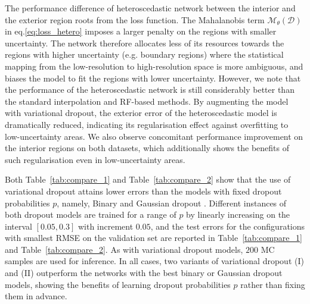 The performance difference of heteroscedastic network between the interior and the exterior region roots from the loss function. The Mahalanobis term $\mathcal{M}_{\theta}(\mathcal{D})$ in eq.\eqref{eq:loss_hetero} imposes a larger penalty on the regions with smaller  uncertainty. The network therefore allocates less of its resources towards the regions with higher uncertainty (e.g. boundary regions) where the statistical mapping from the low-resolution to high-resolution space is more ambiguous, and biases the model to fit the regions with lower uncertainty. However, we note that the performance of the heteroscedastic network is still considerably better than the standard interpolation and RF-based methods. By augmenting the model with variational dropout, the exterior error of the heteroscedastic model is dramatically reduced, indicating its regularisation effect against overfitting to low-uncertainty areas. We also observe concomitant performance improvement on the interior regions on both datasets, which additionally shows the benefits of such regularisation even in low-uncertainty areas. 

Both Table~\ref{tab:compare_1} and Table~\ref{tab:compare_2} show that the use of variational dropout attains lower errors than the models with fixed dropout probabilities $p$, namely, Binary and Gaussian dropout \cite{srivastava2014dropout}. Different instances of both dropout models are trained for a range of $p$ by linearly increasing on the interval $[0.05,0.3]$ with increment $0.05$, and the test errors for the configurations with smallest RMSE on the validation set are reported in Table~\ref{tab:compare_1} and Table~\ref{tab:compare_2}. As with variational dropout models, $200$ MC samples are used for inference. In all cases, two variants of variational dropout (I) and (II) outperform the networks with the best binary or Gaussian dropout models, showing the benefits of learning dropout probabilities $p$ rather than fixing them in advance. 

